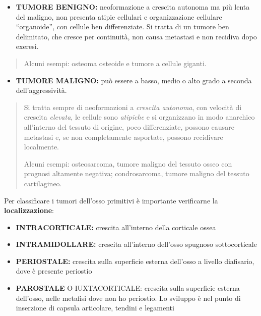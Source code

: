 \documentclass[]{article}
\begin{document}
\begin{itemize}
\item
  \textbf{TUMORE BENIGNO:} neoformazione a crescita autonoma ma più
  lenta del maligno, non presenta atipie cellulari e organizzazione
  cellulare ``organoide'', con cellule ben differenziate. Si tratta di
  un tumore ben delimitato, che cresce per continuità, non causa
  metastasi e non recidiva dopo exeresi.
\end{itemize}

\begin{quote}
Alcuni esempi: osteoma osteoide e tumore a cellule giganti.
\end{quote}

\begin{itemize}
\item
  \textbf{TUMORE MALIGNO:} può essere a basso, medio o alto grado a
  seconda dell'aggressività.
\end{itemize}

\begin{quote}
Si tratta sempre di neoformazioni a \emph{crescita autonoma}, con
velocità di crescita \emph{elevata}, le cellule sono \emph{atipiche} e
si organizzano in modo anarchico all'interno del tessuto di origine,
poco differenziate, possono causare metastasi e, se non completamente
asportate, possono recidivare localmente.

Alcuni esempi: osteosarcoma, tumore maligno del tessuto osseo con
prognosi altamente negativa; condrosarcoma, tumore maligno del tessuto
cartilagineo.
\end{quote}

Per classificare i tumori dell'osso primitivi è importante verificarne
la \textbf{localizzazione}:

\begin{itemize}
\item
  \textbf{INTRACORTICALE:} crescita all'interno della corticale ossea
\item
  \textbf{INTRAMIDOLLARE:} crescita all'interno dell'osso spugnoso
  sottocorticale
\item
  \textbf{PERIOSTALE:} crescita sulla superficie esterna dell'osso a
  livello diafisario, dove è presente periostio
\item
  \textbf{PAROSTALE} O IUXTACORTICALE: crescita sulla superficie esterna
  dell'osso, nelle metafisi dove non ho periostio. Lo sviluppo è nel
  punto di inserzione di capsula articolare, tendini e legamenti
\end{itemize}
\end{document}
